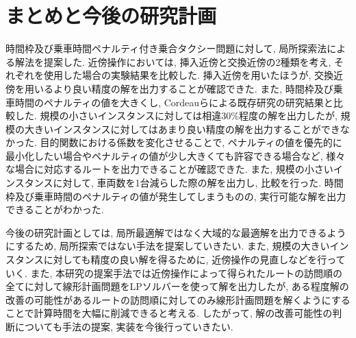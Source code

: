 \chapter{まとめと今後の研究計画}\label{conclution}
時間枠及び乗車時間ペナルティ付き乗合タクシー問題に対して, 局所探索法による解法を提案した. 近傍操作においては, 挿入近傍と交換近傍の2種類を考え, それぞれを使用した場合の実験結果を比較した. 挿入近傍を用いたほうが, 交換近傍を用いるより良い精度の解を出力することが確認できた. また, 時間枠及び乗車時間のペナルティの値を大きくし, Cordeauらによる既存研究の研究結果と比較した. 規模の小さいインスタンスに対しては相違30\%程度の解を出力したが, 規模の大きいインスタンスに対してはあまり良い精度の解を出力することができなかった. 目的関数における係数を変化させることで, ペナルティの値を優先的に最小化したい場合やペナルティの値が少し大きくても許容できる場合など, 様々な場合に対応するルートを出力できることが確認できた. 
また, 規模の小さいインスタンスに対して, 車両数を1台減らした際の解を出力し, 比較を行った. 時間枠及び乗車時間のペナルティの値が発生してしまうものの, 実行可能な解を出力できることがわかった.

今後の研究計画としては, 局所最適解ではなく大域的な最適解を出力できるようにするため, 局所探索ではない手法を提案していきたい.
また, 規模の大きいインスタンスに対しても精度の良い解を得るために, 近傍操作の見直しなどを行っていく.
また, 本研究の提案手法では近傍操作によって得られたルートの訪問順の全てに対して線形計画問題をLPソルバーを使って解を出力したが, ある程度解の改善の可能性があるルートの訪問順に対してのみ線形計画問題を解くようにすることで計算時間を大幅に削減できると考える. したがって, 解の改善可能性の判断についても手法の提案, 実装を今後行っていきたい.
